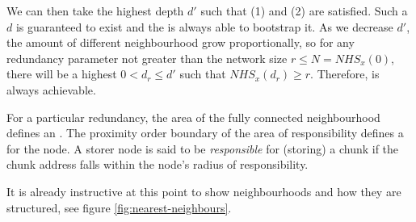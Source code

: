 We can then take the highest depth $d'$ such that (1) and (2) are satisfied. Such a $d$ is guaranteed to exist and the  is always able to bootstrap it. As we decrease $d'$, the amount of different neighbourhood grow proportionally, so for any redundancy parameter not greater than the network size $r\leq N=\mathit{NHS}_x(0)$, there will be a highest $0<d_r\leq d'$ such that $\mathit{NHS}_x(d_r)\geq r$. Therefore,  is always achievable. 



For a particular redundancy, the area of the fully connected neighbourhood defines an . The proximity order boundary of the area of responsibility defines a  for the node. A storer node is said to be \emph{responsible} for (storing) a chunk if the chunk address falls within the node's radius of responsibility.

It is already instructive at this point to show neighbourhoods and how they are structured, see figure \ref{fig:nearest-neighbours}. 

